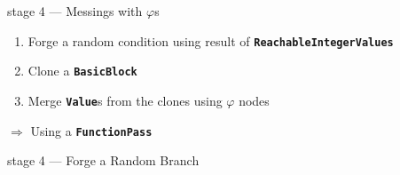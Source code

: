 \documentclass[14pt]{beamer}
\newcommand{\Code}[1]{\textbf{\texttt{#1}}}
\begin{document}
    \begin{frame}{stage 4 --- Messings with $\varphi$s}
        \begin{enumerate}
            \item Forge a random condition using result of \Code{ReachableIntegerValues}
            \item Clone a \Code{BasicBlock}
            \item Merge \Code{Value}s from the clones using $\varphi$ nodes
        \end{enumerate}
        $\Rightarrow$ Using a \Code{FunctionPass}
    \end{frame}

    \begin{frame}[containsverbatim]{stage 4 --- Forge a Random Branch}

        \\
        \begin{minipage}{\textwidth}
        \scriptsize
        
        \end{minipage}

        \\
        \hspace{-2em}%
        \begin{minipage}{\textwidth}
        \scriptsize
        
        \end{minipage}

        \\
        \begin{minipage}{\textwidth}
        \scriptsize
        
        \end{minipage}
    \end{frame}

\end{document}
